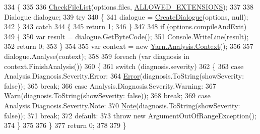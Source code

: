 \begin{DoxyCode}
334         \{
335 
336             \hyperlink{a00169_ad77564b25725a771f0fd4da430582e6f}{CheckFileList}(options.files, \hyperlink{a00169_a0979de7ea02c8c0375b8220a12e6575e}{ALLOWED\_EXTENSIONS});
337 
338             Dialogue dialogue;
339             \textcolor{keywordflow}{try}
340             \{
341                 dialogue = \hyperlink{a00169_aab244361a510cee18ad2f636d110e0d5}{CreateDialogue}(options, null);
342             \}
343             \textcolor{keywordflow}{catch}
344             \{
345                 \textcolor{keywordflow}{return} 1;
346             \}
347 
348             \textcolor{keywordflow}{if} (options.compileAndExit)
349             \{
350                 var result = dialogue.GetByteCode();
351                 Console.WriteLine(result);
352                 \textcolor{keywordflow}{return} 0;
353             \}
354 
355             var context = \textcolor{keyword}{new} \hyperlink{a00035}{Yarn.Analysis.Context}();
356 
357             dialogue.Analyse(context);
358 
359             \textcolor{keywordflow}{foreach} (var diagnosis \textcolor{keywordflow}{in} context.FinishAnalysis())
360             \{
361                 \textcolor{keywordflow}{switch} (diagnosis.severity)
362                 \{
363                     \textcolor{keywordflow}{case} Analysis.Diagnosis.Severity.Error:
364                         \hyperlink{a00169_a2f63f9f5b7634cb50ee75ff2eb18b137}{Error}(diagnosis.ToString(showSeverity: \textcolor{keyword}{false}));
365                         \textcolor{keywordflow}{break};
366                     \textcolor{keywordflow}{case} Analysis.Diagnosis.Severity.Warning:
367                         \hyperlink{a00169_a979bb6f049b6c5294f745a19e24ddd9d}{Warn}(diagnosis.ToString(showSeverity: \textcolor{keyword}{false}));
368                         \textcolor{keywordflow}{break};                      
369                     \textcolor{keywordflow}{case} Analysis.Diagnosis.Severity.Note:
370                         \hyperlink{a00169_a939cc9e943c574b36c6af93e9c772702}{Note}(diagnosis.ToString(showSeverity: \textcolor{keyword}{false}));
371                         \textcolor{keywordflow}{break};
372                     \textcolor{keywordflow}{default}:
373                         \textcolor{keywordflow}{throw} \textcolor{keyword}{new} ArgumentOutOfRangeException();
374                 \}
375 
376             \}
377             \textcolor{keywordflow}{return} 0;
378 
379         \}
\end{DoxyCode}
